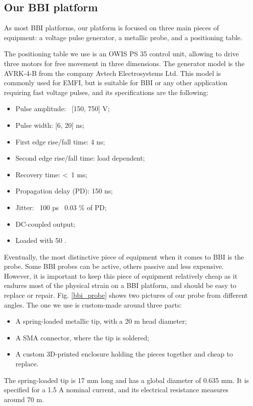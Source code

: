 	\subsection{Our BBI platform}
		As most BBI platforms, our platform is focused on three main pieces of equipment: a voltage pulse generator, a metallic probe, and a positioning table.
		
		The positioning table we use is an OWIS PS 35 control unit, allowing to drive three motors for free movement in three dimensions.
		The generator model is the AVRK-4-B from the company Avtech Electrosystems Ltd.
		This model is commonly used for EMFI, but is suitable for BBI or any other application requiring fast voltage pulses, and its specifications are the following:
		\begin{itemize}
			\item Pulse amplitude: \textpm\ [150, 750] V;
			\item Pulse width: [6, 20] ns;
			\item First edge rise/fall time: 4 ns;
			\item Second edge rise/fall time: load dependent;
			\item Recovery time: \textless\ 1 ms;
			\item Propagation delay (PD): 150 ns;
			\item Jitter: \textpm\ 100 ps \textpm\ 0.03 \% of PD;
			\item DC-coupled output;
			\item Loaded with 50 \textOmega.
		\end{itemize}
		
		Eventually, the most distinctive piece of equipment when it comes to BBI is the probe.
		Some BBI probes can be active, others passive and less expensive.
		However, it is important to keep this piece of equipment relatively cheap as it endures most of the physical strain on a BBI platform, and should be easy to replace or repair.
		Fig. \ref{bbi_probe} shows two pictures of our probe from different angles.
		The one we use is custom-made around three parts:
		\begin{itemize}
			\item A spring-loaded metallic tip, with a 20 \textmu m head diameter;
			\item A SMA connector, where the tip is soldered;
			\item A custom 3D-printed enclosure holding the pieces together and cheap to replace.
		\end{itemize}
		The spring-loaded tip is 17 mm long and has a global diameter of 0.635 mm.
		It is specified for a 1.5 A nominal current, and its electrical resistance measures around 70 m\textOmega.

